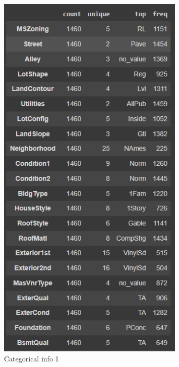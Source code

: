 \begin{figure}[h!]
    \centering
    \includegraphics[width=0.8\textwidth]{imgs/info3.png}
    \caption{Categorical info 1}
    \label{fig:info3}
\end{figure}

